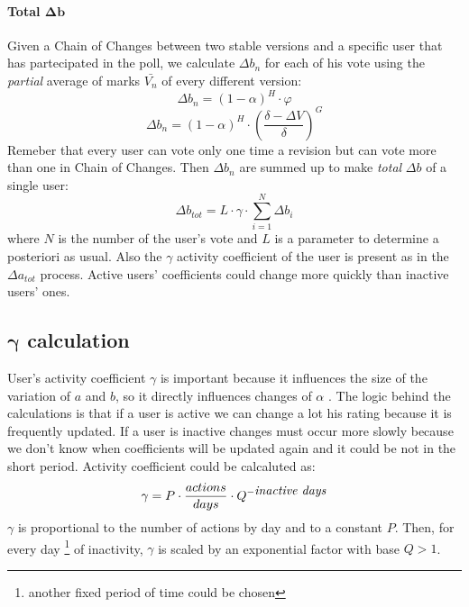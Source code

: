 \documentclass[a4paper,11pt]{article}
\newcommand{\al}{$\alpha$ }
\begin{document}
\paragraph{Total $\mathbf{\Delta b}$}
Given a Chain of Changes between two stable versions and a specific user that has partecipated  in the poll, we calculate $\Delta b_n$ for each of his vote using the \emph{partial} average of marks $\bar{V_n}$ of every different version:
\begin{equation}
\Delta b_n =  \left(1- \alpha\right)^H \cdot \varphi
\end{equation}
\begin{equation}
\Delta b_n = \left(1- \alpha\right)^H \cdot \left(\frac{\delta - \Delta V}{\delta}\right)^G
\end{equation}
Remeber that every user can vote only one time a revision but can vote more than one in Chain of Changes.
Then $\Delta b_n$ are summed up to make \emph{total} $\Delta b$ of a single user:
\begin{equation}
\Delta b_{tot} = L \cdot \gamma \cdot \sum_{i=1}^N \Delta b_i
\end{equation}
where $N$ is the number of the user's vote and $L$ is a parameter to determine a posteriori as usual. Also the $\gamma$ activity coefficient of the user is present as in the $\Delta a_{tot}$ process. Active users' coefficients could change more quickly than inactive users' ones.

\subsection{$\boldsymbol{\gamma}$ calculation} \label{sec:gamma}
User's activity coefficient $\gamma$ is important because it influences the size of the variation of $a$ and $b$, so it directly influences changes of \al.
The logic behind the calculations is that if a user is active we can change a lot his rating because it is frequently updated. If a user is inactive changes must occur more slowly because we don't know when coefficients will be updated again and it could be not in the short period.
Activity coefficient could be calcaluted as:
\begin{equation}
\gamma =  P \cdot \frac{actions}{days} \cdot Q^{-\mbox{\textit{inactive days}}}
\end{equation}
$\gamma$ is proportional to the number of actions by day and to a constant $P$.
Then, for every day \footnote{another fixed period of time could be chosen} of inactivity, $\gamma$ is scaled by an exponential factor with base $Q > 1$.
\end{document}
